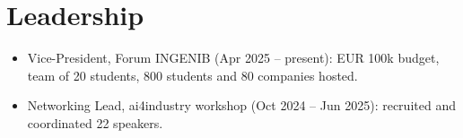 \section{Leadership}
\begin{itemize}
    \item Vice-President, Forum INGENIB (Apr 2025 -- present): EUR 100k budget, team of 20 students, 800 students and 80 companies hosted.
    \item Networking Lead, ai4industry workshop (Oct 2024 -- Jun 2025): recruited and coordinated 22 speakers.
\end{itemize}


